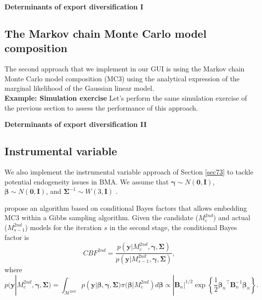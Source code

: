 \textbf{Determinants of export diversification I}


\subsection{The Markov chain Monte Carlo model composition}\label{sec10_22}
The second approach that we implement in our GUI is using the Markov chain Monte Carlo model composition (MC3) using the analytical expression of the marginal likelihood of the Gaussian linear model.\\

\textbf{Example: Simulation exercise}
Let's perform the same simulation exercise of the previous section to assess the performance of this approach. 

\textbf{Determinants of export diversification II}

\subsection{Instrumental variable }\label{sec10_23}

We also implement the instrumental variable approach of Section \ref{sec73} to tackle potential endogeneity issues in BMA. We assume that $\bm{\gamma}\sim {N}(\bm{0},\bm{I})$, $\bm{\beta}\sim {N}(\bm{0},\bm{I})$, and $\bm{\Sigma}^{-1} \sim {W}(3,\bm{I})$ \cite{Karl2012}.

\cite{Lenkoski2013} propose an algorithm based on conditional Bayes factors \cite{Dickey1978} that allows embedding MC3 within a Gibbs sampling algorithm. Given the candidate ($M_{c}^{2nd}$) and actual ($M_{s-1}^{2nd}$) models for the iteration $s$ in the second stage, the conditional Bayes factor is 
\begin{equation*}
	CBF^{2nd}=\frac{p(\bm{y}|M_{c}^{2nd},\bm{\gamma},\bm{\Sigma})}{p(\bm{y}|M_{s-1}^{2nd},\bm{\gamma},\bm{\Sigma})},
\end{equation*}
where 
\begin{equation*}
	p(\bm{y}|M_{c}^{2nd},\bm{\gamma},\bm{\Sigma})=\int_{\mathcal{M}^{2nd}}p(\bm{y}|\bm{\beta},\bm{\gamma},\bm{\Sigma})\pi(\bm{\beta}|M_{c}^{2nd})d\bm{\beta}\propto |\bm{B}_n|^{1/2} \exp\left\{\frac{1}{2}{\bm{\beta}_n}^{\top}\bm{B}_n^{-1}\bm{\beta}_n\right\}
	.
\end{equation*}


